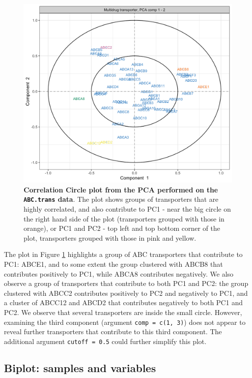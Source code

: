 \documentclass[]{book}
\begin{document}
\begin{figure}

{\centering \includegraphics[width=0.5\linewidth]{Figures/PCA/pca-var-ABStrans-ccp-1} 

}

\caption{\textbf{Correlation Circle plot from the PCA
performed on the \texttt{ABC.trans} data}. The plot shows groups of
transporters that are highly correlated, and also contribute to PC1 -
near the big circle on the right hand side of the plot (transporters
grouped with those in orange), or PC1 and PC2 - top left and top bottom
corner of the plot, transporters grouped with those in pink and yellow.}\label{fig:pca-var-ABStrans-ccp}
\end{figure}








The plot in Figure \ref{fig:pca-var-ABStrans-ccp} highlights a group of
ABC transporters that contribute to PC1: ABCE1, and to some extent the
group clustered with ABCB8 that contributes positively to PC1, while
ABCA8 contributes negatively. We also observe a group of transporters
that contribute to both PC1 and PC2: the group clustered with ABCC2
contributes positively to PC2 and negatively to PC1, and a cluster of
ABCC12 and ABCD2 that contributes negatively to both PC1 and PC2. We
observe that several transporters are inside the small circle. However,
examining the third component (argument \texttt{comp\ =\ c(1,\ 3)}) does
not appear to reveal further transporters that contribute to this third
component. The additional argument \texttt{cutoff\ =\ 0.5} could further
simplify this plot.

\subsection{Biplot: samples and
variables}\label{biplot-samples-and-variables}
\end{document}
